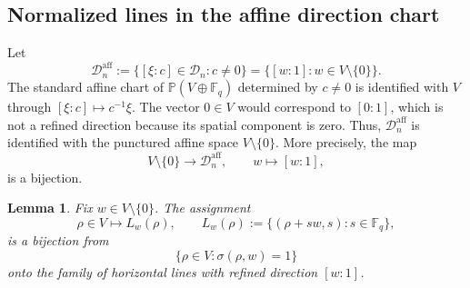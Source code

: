 \documentclass[11pt,letterpaper]{amsart}
\numberwithin{equation}{section}
\newtheorem{lemma}[lemma]{Lemma}
\theoremstyle{definition}
\theoremstyle{remark}
\newcommand{\Fq}{\mathbb F_q}
\newcommand{\Dn}{\mathcal D_n}
\begin{document}
\subsection{Normalized lines in the affine direction chart}

Let
\begin{equation}\label{eq:affine-chart-directions}
 \Dn^{\mathrm{aff}}
 :=
 \bigl\{[\xi:c]\in\Dn:c\neq0\bigr\}
 =
 \bigl\{[w:1]:w\in V\setminus\{0\}\bigr\}.
\end{equation}
The standard affine chart of $\mathbb P(V\oplus\Fq)$ determined by
$c\neq0$ is identified with $V$ through
$[\xi:c]\mapsto c^{-1}\xi$.  The vector $0\in V$ would correspond to
$[0:1]$, which is not a refined direction because its spatial component is zero. Thus, $\Dn^{\mathrm{aff}}$ is identified with the punctured affine space $V\setminus\{0\}$.  More precisely, the map
\[
 V\setminus\{0\}\longrightarrow\Dn^{\mathrm{aff}},
 \qquad
 w\longmapsto[w:1],
\]
is a bijection. 

\begin{lemma}
\label{lem:normalized-horizontal-lines}
Fix $w\in V\setminus\{0\}$.  The assignment
\[
 \rho\in V\longmapsto L_w(\rho),
 \qquad
 L_w(\rho)
 :=
 \bigl\{(\rho+sw,s):s\in\Fq\bigr\},
\]
is a bijection from
\[
 \bigl\{\rho\in V:\sigma(\rho,w)=1\bigr\}
\]
onto the family of horizontal lines with refined direction $[w:1]$.
\end{lemma}
\end{document}
